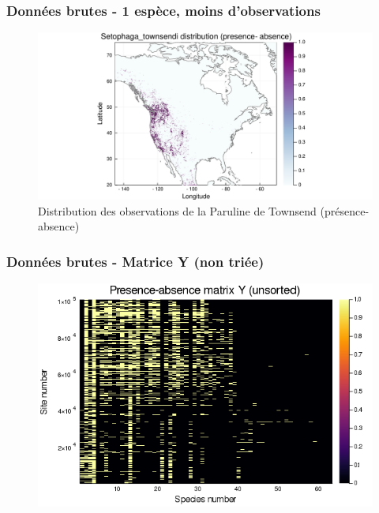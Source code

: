 \documentclass[10pt]{beamer}
\begin{document}
\begin{frame}
  \frametitle{Données brutes - 1 espèce, moins d'observations}
  \begin{figure}
    \centering
    \hspace*{-2cm}\includegraphics[scale=0.5]{../fig/raw/raw-sp-Setophaga_townsendi.pdf}
    \caption{Distribution des observations de la Paruline de Townsend (présence-absence)}
  \end{figure}
\end{frame}

\begin{frame}
  \frametitle{Données brutes - Matrice Y (non triée)}
  \begin{figure}
    \centering
    \hspace*{-2cm}\includegraphics[scale=0.5]{../fig/raw/raw-Y-unsorted.png}
  \end{figure}
\end{frame}
\end{document}
